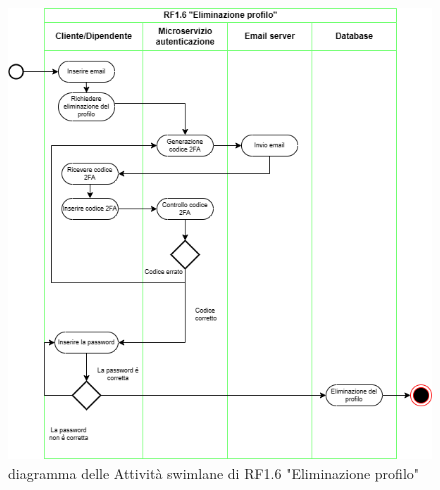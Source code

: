 \documentclass{report}
\begin{document}
\begin{figure}[H]
	\centering\includegraphics[width=1\textwidth]{images/eliminazione_profilo_swimlane.drawio.png}
	diagramma delle Attività swimlane di RF1.6 "Eliminazione profilo"
\end{figure}
\end{document}
